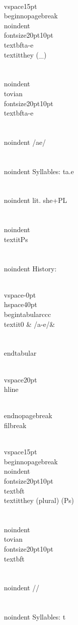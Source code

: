 \\vspace{15pt}
\\begin{nopagebreak}
\\noindent{\\fontsize{20pt}{10pt}\\textbf{ta-e} } \\textit{they} (_)\\\\
\\noindent {\\tovian \\fontsize{20pt}{10pt} \\textbf{ta-e} }\\\\
\\noindent /{}{\textprimstress}ae/\\\\
\\noindent Syllables: ta.e\\\\
\\noindent lit. she+PL\\\\
\\noindent \\textit{Ps}\\\\


\\noindent History:

\\vspace{-0pt}
\\hspace{40pt}
\\begin{tabular}{ccc}
\\textit{0} & /{}a-e/& \\\\
\\end{tabular}

\\vspace{20pt}\\hline

\\end{nopagebreak}
\\filbreak



\\vspace{15pt}
\\begin{nopagebreak}
\\noindent{\\fontsize{20pt}{10pt}\\textbf{t} } \\textit{they (plural)} (Ps)\\\\
\\noindent {\\tovian \\fontsize{20pt}{10pt} \\textbf{t} }\\\\
\\noindent /{}/\\\\
\\noindent Syllables: t\\\\


